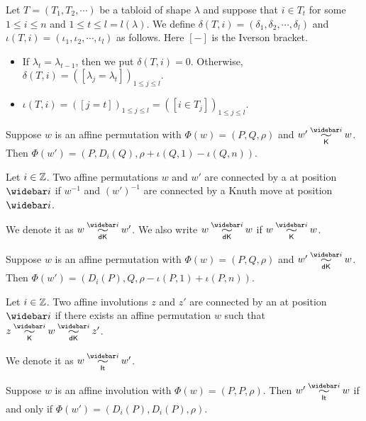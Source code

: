 \documentclass[11pt]{article}
\begin{document}
\begin{definition}
Let $T=(T_1,T_2,\cdots)$ be a tabloid of shape $\lambda$ and suppose that $i\in T_t$ for some $1\le i\le n$ and $1\le t\le l=l(\lambda)$. We define
$\delta(T,i)=(\delta_1,\delta_2,\cdots,\delta_l)$ and $\iota(T,i)=(\iota_1,\iota_2,\cdots,\iota_l)$ as follows. Here $[-]$ is the Iverson bracket.
\begin{itemize}
\item If $\lambda_t=\lambda_{t-1}$, then we put $\delta(T,i)=0$. Otherwise,
$\delta(T,i)=([\lambda_j =\lambda_t])_{1\le j\le l}$.
\item $\iota(T, i)=([j = t])_{1\le j\le l}=([i\in T_j ])_{1\le j\le l}$.
\end{itemize}
\end{definition}

\begin{theorem}\label{Kthm}
Suppose $w$ is an affine permutation with $\Phi(w)=(P,Q,\rho)$ and $w'\K{\widebar i}w$. Then $\Phi(w')=(P,D_i(Q),\rho+\iota(Q,1)-\iota(Q,n))$.
\end{theorem}

\begin{definition}
Let $i\in\mathbb{Z}$. Two affine permutations $w$ and $w'$ are connected by a  at position $\widebar i$ if $w^{-1}$ and $(w')^{-1}$ are connected by a Knuth move at position $\widebar i$.
\end{definition}
We denote it as $w\dK{\widebar i}w'$. We also write $w\dK{\widebar i}w$ if $w\K{\widebar i}w$.


\begin{proposition}[{\cite[Proposition 5.10]{KP}}]\label{dKprop}
Suppose $w$ is an affine permutation with $\Phi(w)=(P,Q,\rho)$ and $w'\dK{\widebar i}w$. Then $\Phi(w')=(D_i(P),Q,\rho-\iota(P,1)+\iota(P,n))$.
\end{proposition}

\begin{definition}
Let $i\in\mathbb{Z}$. Two affine involutions $z$ and $z'$ are connected by an  at position $\widebar i$ if there exists an affine permutation $w$ such that $z\K{\widebar i}w\dK{\widebar i}z'$.
\end{definition}
We denote it as $w\simRBS{\widebar i}w'$.

\begin{corollary}[{\cite[Proposition 5.10]{KP}}]\label{invol-cor}
Suppose $w$ is an affine involution with $\Phi(w)=(P,P,\rho)$. Then  $w'\simRBS{\widebar i}w$ if and only if $\Phi(w')=(D_i(P),D_i(P),\rho)$.
\end{corollary}
\end{document}
